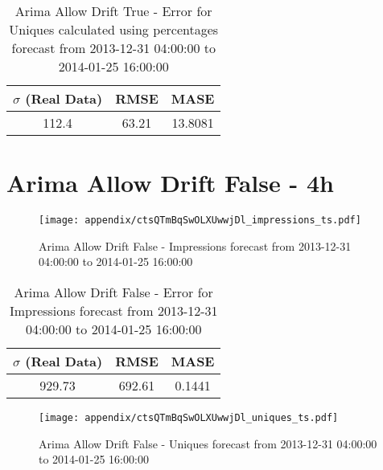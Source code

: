 \begin{table}[H]
\centering
\footnotesize
\begin{tabular}{ccc}
$\sigma$ (Real Data) & RMSE & MASE   \\ \hline
112.4 & 63.21 & 13.8081 \\
\end{tabular}

\vspace{0.5cm}

\caption{
Arima Allow Drift True - Error for Uniques calculated using percentages forecast from 2013-12-31 04:00:00 to 2014-01-25 16:00:00}
\end{table}

\section{Arima Allow Drift False - 4h}
\begin{figure}[H] \begin{center} \leavevmode
\texttt{[image: appendix/ctsQTmBqSwOLXUwwjDl\_impressions\_ts.pdf]} \caption{
Arima Allow Drift False - Impressions forecast from 2013-12-31 04:00:00 to 2014-01-25 16:00:00} \label{fig:appendix/ctsQTmBqSwOLXUwwjDl_impressions_ts.pdf} \end{center}
\end{figure}

\begin{table}[H]
\centering
\footnotesize
\begin{tabular}{ccc}
$\sigma$ (Real Data) & RMSE & MASE   \\ \hline
929.73 & 692.61 & 0.1441 \\
\end{tabular}

\vspace{0.5cm}

\caption{
Arima Allow Drift False - Error for Impressions forecast from 2013-12-31 04:00:00 to 2014-01-25 16:00:00}
\end{table}

\begin{figure}[H] \begin{center} \leavevmode
\texttt{[image: appendix/ctsQTmBqSwOLXUwwjDl\_uniques\_ts.pdf]} \caption{
Arima Allow Drift False - Uniques forecast from 2013-12-31 04:00:00 to 2014-01-25 16:00:00} \label{fig:appendix/ctsQTmBqSwOLXUwwjDl_uniques_ts.pdf} \end{center}
\end{figure}

